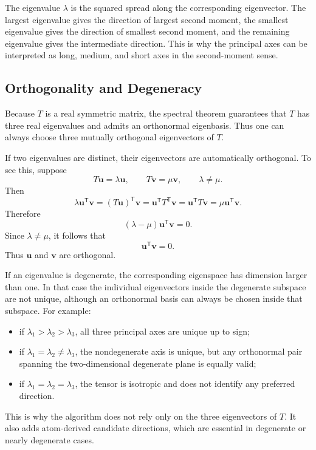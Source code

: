 \documentclass[11pt]{article}
\newcommand{\T}{\mathsf{T}}
\begin{document}
The eigenvalue \(\lambda\) is the squared spread along the corresponding
eigenvector.  The largest eigenvalue gives the direction of largest second
moment, the smallest eigenvalue gives the direction of smallest second moment,
and the remaining eigenvalue gives the intermediate direction.  This is why the
principal axes can be interpreted as long, medium, and short axes in the
second-moment sense.

\subsection{Orthogonality and Degeneracy}

Because \(T\) is a real symmetric matrix, the spectral theorem guarantees that
\(T\) has three real eigenvalues and admits an orthonormal eigenbasis.  Thus one
can always choose three mutually orthogonal eigenvectors of \(T\).

If two eigenvalues are distinct, their eigenvectors are automatically
orthogonal.  To see this, suppose
\[
    T\mathbf u = \lambda \mathbf u,
    \qquad
    T\mathbf v = \mu \mathbf v,
    \qquad
    \lambda\ne\mu.
\]
Then
\[
    \lambda \mathbf u^{\T}\mathbf v
    =
    (T\mathbf u)^{\T}\mathbf v
    =
    \mathbf u^{\T}T^{\T}\mathbf v
    =
    \mathbf u^{\T}T\mathbf v
    =
    \mu \mathbf u^{\T}\mathbf v.
\]
Therefore
\[
    (\lambda-\mu)\mathbf u^{\T}\mathbf v=0.
\]
Since \(\lambda\ne\mu\), it follows that
\[
    \mathbf u^{\T}\mathbf v=0.
\]
Thus \(\mathbf u\) and \(\mathbf v\) are orthogonal.

If an eigenvalue is degenerate, the corresponding eigenspace has dimension
larger than one.  In that case the individual eigenvectors inside the degenerate
subspace are not unique, although an orthonormal basis can always be chosen
inside that subspace.  For example:
\begin{itemize}
    \item if \(\lambda_1>\lambda_2>\lambda_3\), all three principal axes are
    unique up to sign;
    \item if \(\lambda_1=\lambda_2\ne\lambda_3\), the nondegenerate axis is
    unique, but any orthonormal pair spanning the two-dimensional degenerate
    plane is equally valid;
    \item if \(\lambda_1=\lambda_2=\lambda_3\), the tensor is isotropic and does
    not identify any preferred direction.
\end{itemize}
This is why the algorithm does not rely only on the three eigenvectors of
\(T\).  It also adds atom-derived candidate directions, which are essential in
degenerate or nearly degenerate cases.
\end{document}
